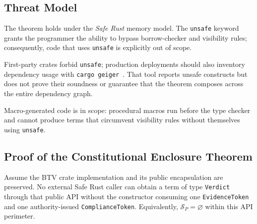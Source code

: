 \subsection{Threat Model}
\label{sec:threat}

The theorem holds under the \emph{Safe Rust} memory model.
The \texttt{unsafe} keyword grants the programmer the ability to
bypass borrow-checker and visibility rules; consequently, code that
uses \texttt{unsafe} is explicitly out of scope.

First-party crates forbid \texttt{unsafe}; production deployments should
also inventory dependency usage with \texttt{cargo geiger}~\cite{cargogeiger}.
That tool reports unsafe constructs but does not prove their soundness or
guarantee that the theorem composes across the entire dependency graph.

Macro-generated code is in scope: procedural macros run before the
type checker and cannot produce terms that circumvent visibility rules
without themselves using \texttt{unsafe}.

\subsection{Proof of the Constitutional Enclosure Theorem}
\label{sec:proof}

\begin{theorem}
\label{thm:enclosure}
Assume the BTV crate implementation and its public encapsulation are
preserved.  No external Safe Rust caller can obtain a term of type
\texttt{Verdict} through that public API without the constructor consuming
one \texttt{EvidenceToken} and one authority-issued
\texttt{ComplianceToken}.  Equivalently, $\mathcal{S}_{P}=\varnothing$
within this API perimeter.
\end{theorem}

